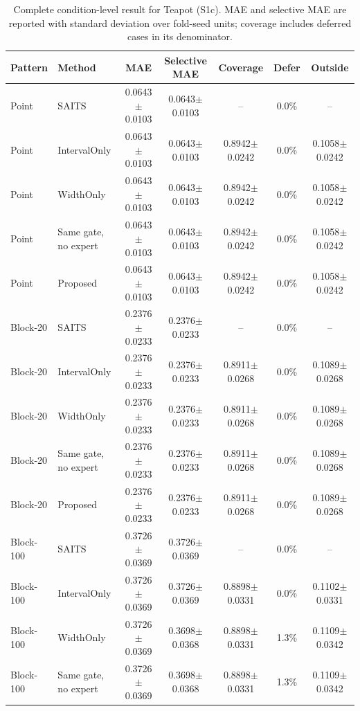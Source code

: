 \begin{table}
\caption{Complete condition-level result for Teapot (S1c).
MAE and selective MAE are reported with standard deviation over fold-seed units;
coverage includes deferred cases in its denominator.}
\label{tab:s1c}
\centering
\scriptsize
\setlength{\tabcolsep}{4pt}
\begin{tabular*}{\textwidth}{@{\extracolsep{\fill}}llccccc@{}}
\toprule
Pattern & Method & MAE & Selective MAE & Coverage & Defer & Outside \\
\midrule
Point & SAITS & 0.0643$\pm$0.0103 & 0.0643$\pm$0.0103 & -- & 0.0\% & -- \\
Point & IntervalOnly & 0.0643$\pm$0.0103 & 0.0643$\pm$0.0103 & 0.8942$\pm$0.0242 & 0.0\% & 0.1058$\pm$0.0242 \\
Point & WidthOnly & 0.0643$\pm$0.0103 & 0.0643$\pm$0.0103 & 0.8942$\pm$0.0242 & 0.0\% & 0.1058$\pm$0.0242 \\
Point & Same gate, no expert & 0.0643$\pm$0.0103 & 0.0643$\pm$0.0103 & 0.8942$\pm$0.0242 & 0.0\% & 0.1058$\pm$0.0242 \\
Point & Proposed & 0.0643$\pm$0.0103 & 0.0643$\pm$0.0103 & 0.8942$\pm$0.0242 & 0.0\% & 0.1058$\pm$0.0242 \\
\addlinespace[1.5pt]
Block-20 & SAITS & 0.2376$\pm$0.0233 & 0.2376$\pm$0.0233 & -- & 0.0\% & -- \\
Block-20 & IntervalOnly & 0.2376$\pm$0.0233 & 0.2376$\pm$0.0233 & 0.8911$\pm$0.0268 & 0.0\% & 0.1089$\pm$0.0268 \\
Block-20 & WidthOnly & 0.2376$\pm$0.0233 & 0.2376$\pm$0.0233 & 0.8911$\pm$0.0268 & 0.0\% & 0.1089$\pm$0.0268 \\
Block-20 & Same gate, no expert & 0.2376$\pm$0.0233 & 0.2376$\pm$0.0233 & 0.8911$\pm$0.0268 & 0.0\% & 0.1089$\pm$0.0268 \\
Block-20 & Proposed & 0.2376$\pm$0.0233 & 0.2376$\pm$0.0233 & 0.8911$\pm$0.0268 & 0.0\% & 0.1089$\pm$0.0268 \\
\addlinespace[1.5pt]
Block-100 & SAITS & 0.3726$\pm$0.0369 & 0.3726$\pm$0.0369 & -- & 0.0\% & -- \\
Block-100 & IntervalOnly & 0.3726$\pm$0.0369 & 0.3726$\pm$0.0369 & 0.8898$\pm$0.0331 & 0.0\% & 0.1102$\pm$0.0331 \\
Block-100 & WidthOnly & 0.3726$\pm$0.0369 & 0.3698$\pm$0.0368 & 0.8898$\pm$0.0331 & 1.3\% & 0.1109$\pm$0.0342 \\
Block-100 & Same gate, no expert & 0.3726$\pm$0.0369 & 0.3698$\pm$0.0368 & 0.8898$\pm$0.0331 & 1.3\% & 0.1109$\pm$0.0342 \\

\end{tabular*}
\end{table}
